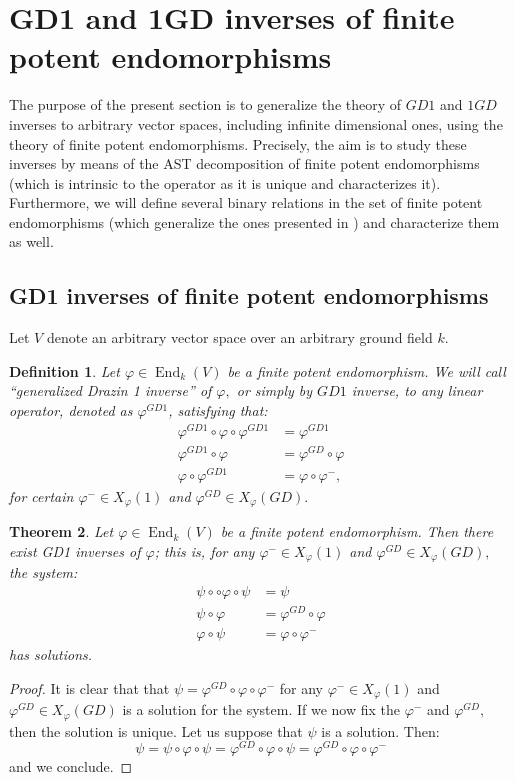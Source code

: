 \documentclass[10pt,a4paper]{amsart}
\newtheorem{defn}{Definition}
\newtheorem{thm}[defn]{Theorem}
\theoremstyle{plain}
\theoremstyle{remark}
\numberwithin{equation}{section} \numberwithin{defn}{section}
\newcommand\ed{\operatorname{End}}
\newcommand{\f}{\varphi}
\newcommand{\g}{\psi}
\begin{document}
\section{GD1 and 1GD inverses of finite potent endomorphisms}\label{s: GD1 and 1GD}

The purpose of the present section is to generalize the theory of $GD1$ and $1GD$ inverses to arbitrary vector spaces, including infinite dimensional ones, using the theory of finite potent endomorphisms. Precisely, the aim is to study these inverses by means of the AST decomposition of finite potent endomorphisms (which is intrinsic to the operator as it is unique and characterizes it). Furthermore, we will define several binary relations in the set of finite potent endomorphisms (which generalize the ones presented in \cite{GD1N}) and characterize them as well.

\subsection{GD1 inverses of finite potent endomorphisms}\label{ss: GD1 FP}
Let $V$ denote an arbitrary vector space over an arbitrary ground field $k.$ 
\begin{defn}\label{D: GD1 }
Let $\f \in \ed_k(V)$ be a finite potent endomorphism. We will call ``generalized Drazin 1 inverse'' of $\f,$ or simply by $GD1$ inverse, to any linear operator, denoted as $\f^{GD1}$, satisfying that: \begin{align*}
\f^{GD1}\circ \f \circ \f^{GD1}& =\f^{GD1}\\
\f^{GD1}\circ \f & = \f^{GD}\circ \f \\
\f\circ \f^{GD1} & = \f \circ \f^-,
\end{align*} 
for certain $\f^-\in X_{\f}(1)$ and $\f^{GD}\in X_{\f}(GD).$
\end{defn} 


\begin{thm}\label{T: Existencia}
Let $\f\in \ed_k(V)$ be a finite potent endomorphism. Then there exist GD1 inverses of $\f$; this is, for any $\f^-\in X_{\f}(1)$ and $\f^{GD}\in X_{\f}(GD),$ the system: \begin{align*}
\g \circ \circ \f \circ \g & = \g \\
\g \circ \f & = \f^{GD} \circ \f \\
\f \circ \g &= \f \circ \f^{-}
\end{align*} has solutions.
\end{thm}
\begin{proof}
It is clear that that $\g=\f^{GD}\circ \f \circ \f^{-}$ for any $\f^{-}\in X_{\f}(1)$ and $\f^{GD}\in X_{\f}(GD)$ is a solution for the system. If we now fix the $\f^-$ and $\f^{GD},$ then the solution is unique. Let us suppose that $\g$ is a solution. Then:
$$\g=\g\circ \f \circ \g=\f^{GD}\circ \f \circ \g=\f^{GD}\circ \f \circ \f^- $$ and we conclude.
\end{proof}
\end{document}
